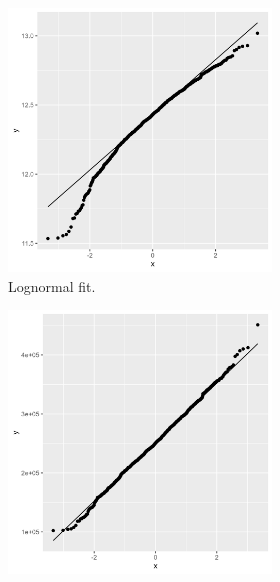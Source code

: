 \documentclass[11pt]{article}
\begin{document}
\begin{figure}[!h]
\centering
\begin{subfigure}{.49\textwidth}
    \begin{subfigure}{.5\textwidth}
      \centering
      \includegraphics[width=.9\linewidth]{plots/claim_type1/qqplot_lognormality.png}
      \caption{Lognormal fit.}
    \end{subfigure}%
    \begin{subfigure}{.5\textwidth}
      \centering
      \includegraphics[width=.9\linewidth]{plots/claim_type1/qqplot_normality.png}

\end{subfigure}
\end{subfigure}
\end{figure}
\end{document}
